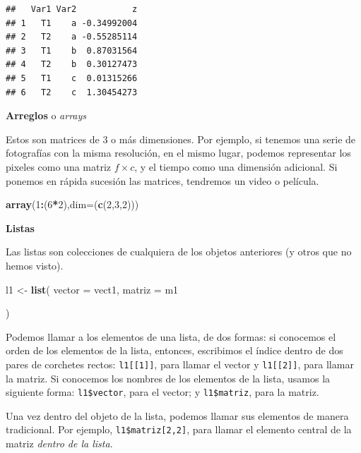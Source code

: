 \documentclass[12pt,letterpaper,]{book}
\newenvironment{Shaded}{\begin{snugshade}}{\end{snugshade}}
\newcommand{\KeywordTok}[1]{\textcolor[rgb]{0.13,0.29,0.53}{\textbf{#1}}}
\newcommand{\DataTypeTok}[1]{\textcolor[rgb]{0.13,0.29,0.53}{#1}}
\newcommand{\DecValTok}[1]{\textcolor[rgb]{0.00,0.00,0.81}{#1}}
\newcommand{\StringTok}[1]{\textcolor[rgb]{0.31,0.60,0.02}{#1}}
\newcommand{\OperatorTok}[1]{\textcolor[rgb]{0.81,0.36,0.00}{\textbf{#1}}}
\newcommand{\NormalTok}[1]{#1}
\begin{document}
\begin{verbatim}
##   Var1 Var2           z
## 1   T1    a -0.34992004
## 2   T2    a -0.55285114
## 3   T1    b  0.87031564
## 4   T2    b  0.30127473
## 5   T1    c  0.01315266
## 6   T2    c  1.30454273
\end{verbatim}

\textbf{Arreglos} o \emph{arrays}

Estos son matrices de 3 o más dimensiones. Por ejemplo, si tenemos una
serie de fotografías con la misma resolución, en el mismo lugar, podemos
representar los pixeles como una matriz \(f\times c\), y el tiempo como
una dimensión adicional. Si ponemos en rápida sucesión las matrices,
tendremos un video o película.

\begin{Shaded}
\begin{Highlighting}[]
\KeywordTok{array}\NormalTok{(}\DecValTok{1}\OperatorTok{:}\NormalTok{(}\DecValTok{6}\OperatorTok{*}\DecValTok{2}\NormalTok{),}\DataTypeTok{dim=}\NormalTok{(}\KeywordTok{c}\NormalTok{(}\DecValTok{2}\NormalTok{,}\DecValTok{3}\NormalTok{,}\DecValTok{2}\NormalTok{)))}
\end{Highlighting}
\end{Shaded}

\textbf{Listas}

Las listas son colecciones de cualquiera de los objetos anteriores (y
otros que no hemos visto).

\begin{Shaded}
\begin{Highlighting}[]
\NormalTok{l1 <-}\StringTok{ }\KeywordTok{list}\NormalTok{(}
  \DataTypeTok{vector =}\NormalTok{ vect1,}
  \DataTypeTok{matriz =}\NormalTok{ m1}
  
\NormalTok{)}
\end{Highlighting}
\end{Shaded}

Podemos llamar a los elementos de una lista, de dos formas: si conocemos
el orden de los elementos de la lista, entonces, escribimos el índice
dentro de dos pares de corchetes rectos: \texttt{l1{[}{[}1{]}{]}}, para
llamar el vector y \texttt{l1{[}{[}2{]}{]}}, para llamar la matriz. Si
conocemos los nombres de los elementos de la lista, usamos la siguiente
forma: \texttt{l1\$vector}, para el vector; y \texttt{l1\$matriz}, para
la matriz.

Una vez dentro del objeto de la lista, podemos llamar sus elementos de
manera tradicional. Por ejemplo, \texttt{l1\$matriz{[}2,2{]}}, para
llamar el elemento central de la matriz \emph{dentro de la lista}.
\end{document}
